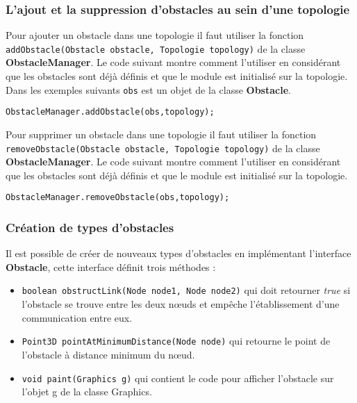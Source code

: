 \documentclass{article}
\begin{document}
\subsubsection{L'ajout et la suppression d'obstacles au sein d'une topologie}

Pour ajouter un obstacle dans une topologie il faut utiliser la fonction \texttt{addObstacle(Obstacle obstacle, Topologie topology)} de la classe \textbf{ObstacleManager}. Le code suivant montre comment l'utiliser en considérant que les obstacles sont déjà définis et que le module est initialisé sur la topologie. Dans les exemples suivants \texttt{obs} est un objet de la classe \textbf{Obstacle}.\smallskip
\begin{lstlisting}[frame=single]
ObstacleManager.addObstacle(obs,topology);
\end{lstlisting}\smallskip
Pour supprimer un obstacle dans une topologie il faut utiliser la fonction \texttt{removeObstacle(Obstacle obstacle, Topologie topology)} de la classe\\ \textbf{ObstacleManager}. Le code suivant montre comment l'utiliser en considérant que les obstacles sont déjà définis et que le module est initialisé sur la topologie.\smallskip
\begin{lstlisting}[frame=single]
ObstacleManager.removeObstacle(obs,topology);
\end{lstlisting}

\subsubsection{Création de types d'obstacles}

Il est possible de créer de nouveaux types d'obstacles en implémentant l'interface \textbf{Obstacle}, cette interface définit trois méthodes :\\
\begin{itemize}

\item \texttt{boolean obstructLink(Node node1, Node node2)} qui doit retourner \emph{true} si l'obstacle se trouve entre les deux n\oe uds et empêche l'établissement d'une communication entre eux.\\

\item \texttt{Point3D pointAtMinimumDistance(Node node)} qui retourne le point de l'obstacle à distance minimum du n\oe ud.\\

\item \texttt{void paint(Graphics g)} qui contient le code pour afficher l'obstacle sur l'objet g de la classe Graphics.\\
\end{itemize}
\end{document}
